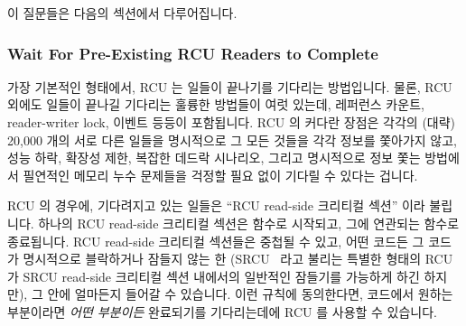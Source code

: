이 질문들은 다음의 섹션에서 다루어집니다.

\subsubsection{Wait For Pre-Existing RCU Readers to Complete}
\label{sec:defer:Wait For Pre-Existing RCU Readers to Complete}

가장 기본적인 형태에서, RCU 는 일들이 끝나기를 기다리는 방법입니다.
물론, RCU 외에도 일들이 끝나길 기다리는 훌륭한 방법들이 여럿 있는데, 레퍼런스
카운트, reader-writer lock, 이벤트 등등이 포함됩니다.
RCU 의 커다란 장점은 각각의 (대략) 20,000 개의 서로 다른 일들을 명시적으로 그
모든 것들을 각각 정보를 쫓아가지 않고, 성능 하락, 확장성 제한, 복잡한 데드락
시나리오, 그리고 명시적으로 정보 쫓는 방법에서 필연적인 메모리 누수 문제들을
걱정할 필요 없이 기다릴 수 있다는 겁니다.

RCU 의 경우에, 기다려지고 있는 일들은 ``RCU read-side 크리티컬 섹션'' 이라
불립니다.
하나의 RCU read-side 크리티컬 섹션은  함수로 시작되고, 그에
연관되는  함수로 종료됩니다.
RCU read-side 크리티컬 섹션들은 중첩될 수 있고, 어떤 코드든 그 코드가
명시적으로 블락하거나 잠들지 않는 한 (SRCU~\cite{PaulEMcKenney2006c} 라고
불리는 특별한 형태의 RCU 가 SRCU read-side 크리티컬 섹션 내에서의 일반적인
잠들기를 가능하게 하긴 하지만), 그 안에 얼마든지 들어갈 수 있습니다.
이런 규칙에 동의한다면, 코드에서 원하는 부분이라면 \emph{어떤 부분이든}
완료되기를 기다리는데에 RCU 를 사용할 수 있습니다.
\iffalse

